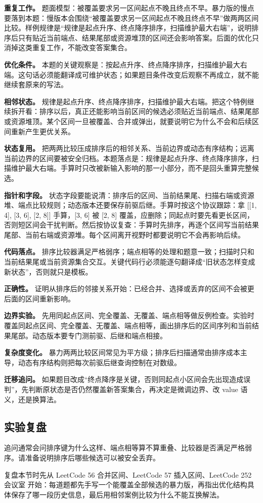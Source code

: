 \textbf{重复工作。} 题面模型：被覆盖要求另一区间起点不晚且终点不早。暴力版的慢点要落到本题：慢版本会围绕“被覆盖要求另一区间起点不晚且终点不早”做两两区间比较。样例规律是“规律是起点升序、终点降序排序，扫描维护最大右端”，说明排序后只有贴近当前端点、结果尾部或资源堆顶的区间还会影响答案。后面的优化只消掉这类重复工作，不能改变答案集合。

\textbf{优化条件。} 本题的关键观察是：按起点升序、终点降序排序，扫描维护最大右端。这句话必须能翻译成可维护状态；如果题目条件改变后观察不再成立，就不能继续套原来的写法。

\textbf{相邻状态。} 规律是起点升序、终点降序排序，扫描维护最大右端。把这个特例继续拆开看：排序以后，真正还能影响当前区间的候选必须贴近当前端点、结果尾部或资源堆顶。某个区间一旦被覆盖、合并或弹出，就要说明它为什么不会和后续区间重新产生更优关系。

\textbf{状态复用。} 把两两比较压成排序后的相邻关系、当前边界或动态有序结构；远离当前边界的区间要被安全归档。本题落点是：规律是起点升序、终点降序排序，扫描维护最大右端。手算时只改被新输入影响的那一小部分，而不是回头重算完整候选。

\textbf{指针和字段。} 状态字段要能说清：排序后的区间、当前结果尾、扫描右端或资源堆、端点比较规则；动态版本还要保存前驱后继。手算时按这个协议跟踪：拿 [[1, 4], [3, 6], [2, 8]] 手算，[3, 6] 被 [2, 8] 覆盖，应删除；同起点时要先看更长区间，否则短区间会干扰判断。然后按协议复查：手算时先排序，再逐个区间写当前结果尾部、当前右端或资源堆。每个区间离开视野时都要说明它不会再影响后续。

\textbf{代码落点。} 排序比较器满足严格弱序；端点相等的处理和题意一致；扫描时只和当前结果尾或当前资源集合交互。关键代码行必须能逐句翻译成“旧状态怎样变成新状态”，否则就只是模板。

\textbf{正确性。} 证明从排序后的邻接关系开始：已经合并、选择或丢弃的区间不会被更后面的区间重新影响。

\textbf{边界实验。} 先用同起点区间、完全覆盖、无覆盖、端点相等做反例检查。实验时覆盖同起点区间、完全覆盖、无覆盖、端点相等，画出排序后的区间序列和当前结果尾部。动态版本要专门测前驱、后继和端点相接。

\textbf{复杂度变化。} 暴力两两比较区间常见为平方级；排序后扫描通常由排序成本主导，动态有序结构则把每次前驱后继查询控制在对数级。

\textbf{迁移追问。} 如果题目改成“终点降序是关键，否则同起点小区间会先出现造成误判”，先判断原状态是否仍然覆盖新答案集合，再决定是微调边界、改 value 语义，还是换算法。

\subsection{实验复盘}

追问通常会问排序键为什么这样、端点相等算不算重叠、比较器是否满足严格弱序。请准备说明排序后哪些候选可以被安全丢弃。

复盘本节时先从 LeetCode 56 合并区间、LeetCode 57 插入区间、LeetCode 252 会议室 开始：每道题都先手写一个能覆盖全部候选的暴力版，再指出优化结构具体保存了哪一段历史信息，最后用相邻案例比较为什么不能互换解法。
